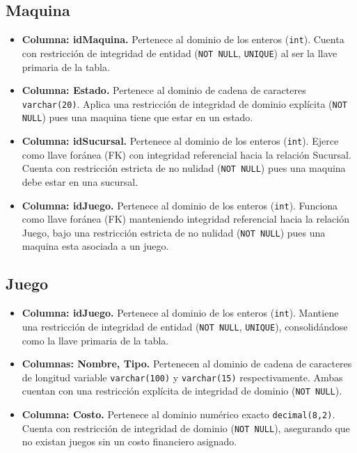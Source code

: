 \documentclass[11pt,letterpaper,spanish]{article}
\begin{document}
\subsection*{Maquina}
\begin{itemize}
	\item \textbf{Columna: idMaquina.} Pertenece al dominio de los enteros (\texttt{int}). Cuenta con restricción de integridad de entidad (\texttt{NOT NULL}, \texttt{UNIQUE}) al ser la llave primaria de la tabla.
	\item \textbf{Columna: Estado.} Pertenece al dominio de cadena de caracteres \texttt{varchar(20)}. Aplica una restricción de integridad de dominio explícita (\texttt{NOT NULL}) pues una maquina tiene que estar en un estado.
	\item \textbf{Columna: idSucursal.} Pertenece al dominio de los enteros (\texttt{int}). Ejerce como llave foránea (FK) con integridad referencial hacia la relación Sucursal. Cuenta con restricción estricta de no nulidad (\texttt{NOT NULL}) pues una maquina debe estar en una sucursal.
	\item \textbf{Columna: idJuego.} Pertenece al dominio de los enteros (\texttt{int}). Funciona como llave foránea (FK) manteniendo integridad referencial hacia la relación Juego, bajo una restricción estricta de no nulidad (\texttt{NOT NULL}) pues una maquina esta asociada a un juego.
\end{itemize}

\subsection*{Juego}
\begin{itemize}
	\item \textbf{Columna: idJuego.} Pertenece al dominio de los enteros (\texttt{int}). Mantiene una restricción de integridad de entidad (\texttt{NOT NULL}, \texttt{UNIQUE}), consolidándose como la llave primaria de la tabla.
	\item \textbf{Columnas: Nombre, Tipo.} Pertenecen al dominio de cadena de caracteres de longitud variable \texttt{varchar(100)} y \texttt{varchar(15)} respectivamente. Ambas cuentan con una restricción explícita de integridad de dominio (\texttt{NOT NULL}).
	\item \textbf{Columna: Costo.} Pertenece al dominio numérico exacto \texttt{decimal(8,2)}. Cuenta con restricción de integridad de dominio (\texttt{NOT NULL}), asegurando que no existan juegos sin un costo financiero asignado.
\end{itemize}
\end{document}
